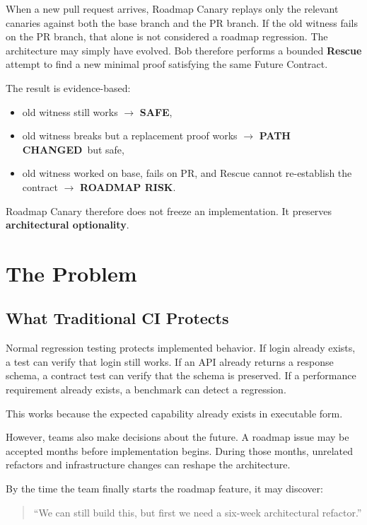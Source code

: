 \documentclass[12pt]{article}
\newcommand{\statussafe}{\textbf{\color{green}SAFE}}
\newcommand{\statuschanged}{\textbf{\color{amber}PATH CHANGED}}
\newcommand{\statusrisk}{\textbf{\color{red}ROADMAP RISK}}
\begin{document}
When a new pull request arrives, Roadmap Canary replays only the relevant canaries against both the base branch and the PR branch. If the old witness fails on the PR branch, that alone is not considered a roadmap regression. The architecture may simply have evolved. Bob therefore performs a bounded \textbf{Rescue} attempt to find a new minimal proof satisfying the same Future Contract.

The result is evidence-based:

\begin{itemize}
    \item old witness still works $\rightarrow$ \statussafe,
    \item old witness breaks but a replacement proof works $\rightarrow$ \statuschanged\ but safe,
    \item old witness worked on base, fails on PR, and Rescue cannot re-establish the contract $\rightarrow$ \statusrisk.
\end{itemize}

Roadmap Canary therefore does not freeze an implementation. It preserves \textbf{architectural optionality}.

\section{The Problem}

\subsection{What Traditional CI Protects}

Normal regression testing protects implemented behavior. If login already exists, a test can verify that login still works. If an API already returns a response schema, a contract test can verify that the schema is preserved. If a performance requirement already exists, a benchmark can detect a regression.

This works because the expected capability already exists in executable form.

However, teams also make decisions about the future. A roadmap issue may be accepted months before implementation begins. During those months, unrelated refactors and infrastructure changes can reshape the architecture.

By the time the team finally starts the roadmap feature, it may discover:

\begin{quote}
``We can still build this, but first we need a six-week architectural refactor.''
\end{quote}
\end{document}
